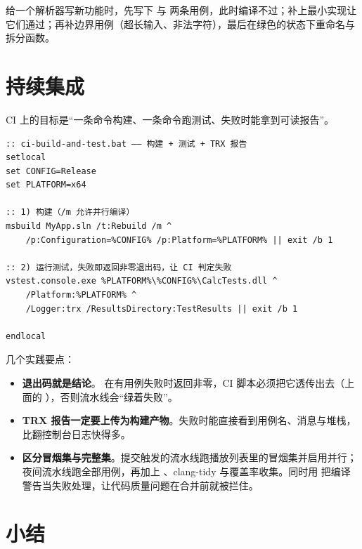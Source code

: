 \begin{keybox}[实战场景]
给一个解析器写新功能时，先写下 \allowbreak{}\allowbreak{} 与 \allowbreak{}\allowbreak{} 两条用例，此时编译不过；补上最小实现让它们通过；再补边界用例（超长输入、非法字符），最后在绿色的状态下重命名与拆分函数。
\end{keybox}

\section{持续集成}

CI 上的目标是“一条命令构建、一条命令跑测试、失败时能拿到可读报告”。

\begin{lstlisting}[style=shellstyle]
:: ci-build-and-test.bat —— 构建 + 测试 + TRX 报告
setlocal
set CONFIG=Release
set PLATFORM=x64

:: 1) 构建（/m 允许并行编译）
msbuild MyApp.sln /t:Rebuild /m ^
    /p:Configuration=%CONFIG% /p:Platform=%PLATFORM% || exit /b 1

:: 2) 运行测试，失败即返回非零退出码，让 CI 判定失败
vstest.console.exe %PLATFORM%\%CONFIG%\CalcTests.dll ^
    /Platform:%PLATFORM% ^
    /Logger:trx /ResultsDirectory:TestResults || exit /b 1

endlocal
\end{lstlisting}

几个实践要点：

\begin{itemize}
  \item \textbf{退出码就是结论}。 在有用例失败时返回非零，CI 脚本必须把它透传出去（上面的 ），否则流水线会“绿着失败”。
  \item \textbf{TRX 报告一定要上传为构建产物}。失败时能直接看到用例名、消息与堆栈，比翻控制台日志快得多。
  \item \textbf{区分冒烟集与完整集}。提交触发的流水线跑播放列表里的冒烟集并启用并行；夜间流水线跑全部用例，再加上 、clang-tidy 与覆盖率收集。同时用  把编译警告当失败处理，让代码质量问题在合并前就被拦住。
\end{itemize}

\section{小结}

